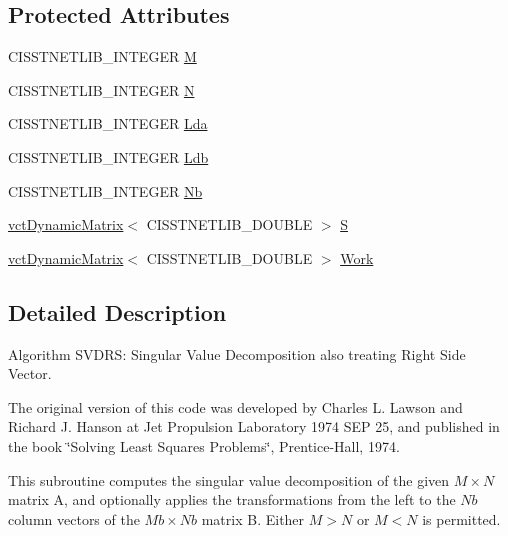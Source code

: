 \subsection*{Protected Attributes}
\begin{DoxyCompactItemize}
\item 
C\+I\+S\+S\+T\+N\+E\+T\+L\+I\+B\+\_\+\+I\+N\+T\+E\+G\+E\+R \hyperlink{classnmr_s_v_d_r_s_solver_ac96d6c9453bc57e859533512ab2022a3}{M}
\item 
C\+I\+S\+S\+T\+N\+E\+T\+L\+I\+B\+\_\+\+I\+N\+T\+E\+G\+E\+R \hyperlink{classnmr_s_v_d_r_s_solver_acf36506705c504c2d35e3c831dfe4871}{N}
\item 
C\+I\+S\+S\+T\+N\+E\+T\+L\+I\+B\+\_\+\+I\+N\+T\+E\+G\+E\+R \hyperlink{classnmr_s_v_d_r_s_solver_aa80a92f8293e49713e6d8f750ba7b774}{Lda}
\item 
C\+I\+S\+S\+T\+N\+E\+T\+L\+I\+B\+\_\+\+I\+N\+T\+E\+G\+E\+R \hyperlink{classnmr_s_v_d_r_s_solver_a4447d227e273f88a53834901df316b95}{Ldb}
\item 
C\+I\+S\+S\+T\+N\+E\+T\+L\+I\+B\+\_\+\+I\+N\+T\+E\+G\+E\+R \hyperlink{classnmr_s_v_d_r_s_solver_a2f397a32b6791b9eb438158f6b620cb5}{Nb}
\item 
\hyperlink{classvct_dynamic_matrix}{vct\+Dynamic\+Matrix}$<$ C\+I\+S\+S\+T\+N\+E\+T\+L\+I\+B\+\_\+\+D\+O\+U\+B\+L\+E $>$ \hyperlink{classnmr_s_v_d_r_s_solver_a7ec50f8b0ef442501f1c0b866f337474}{S}
\item 
\hyperlink{classvct_dynamic_matrix}{vct\+Dynamic\+Matrix}$<$ C\+I\+S\+S\+T\+N\+E\+T\+L\+I\+B\+\_\+\+D\+O\+U\+B\+L\+E $>$ \hyperlink{classnmr_s_v_d_r_s_solver_a96c3cc87d1659d99563064e240d5d087}{Work}
\end{DoxyCompactItemize}


\subsection{Detailed Description}
Algorithm S\+V\+D\+R\+S\+: Singular Value Decomposition also treating Right Side Vector.

The original version of this code was developed by Charles L. Lawson and Richard J. Hanson at Jet Propulsion Laboratory 1974 S\+E\+P 25, and published in the book \char`\"{}\+Solving Least Squares Problems\char`\"{}, Prentice-\/\+Hall, 1974.

This subroutine computes the singular value decomposition of the given $ M \times N $ matrix A, and optionally applies the transformations from the left to the $ Nb $ column vectors of the $ Mb \times Nb $ matrix B. Either $ M > N $ or $ M < N $ is permitted.

